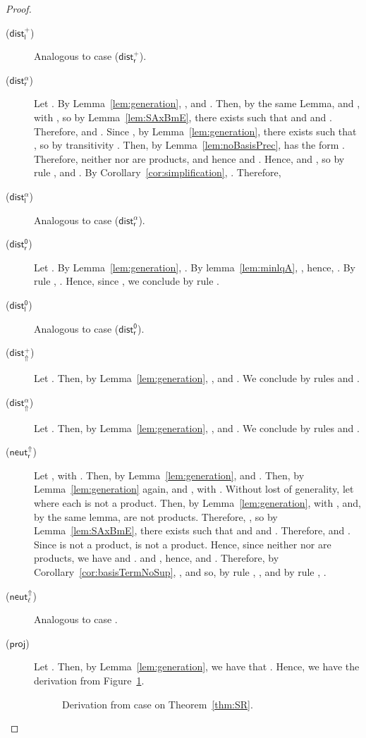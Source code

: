 \documentclass[preprint]{elsarticle}
\newcommand\s[1]{\ensuremath{\mathsf{#1}}}
\newcommand\rdistcasum{(\s{dist^+_\Uparrow})}
\newcommand\rdistcascal{(\s{dist^\alpha_\Uparrow})}
\newcommand\rcaneutl{(\s{neut^\Uparrow_\ell})}
\newcommand\rcaneutr{(\s{neut^\Uparrow_r})}
\newcommand\rproj{(\s{proj})}
\newcommand\rdistzr{(\s{dist^0_r})}
\newcommand\rdistzl{(\s{dist^0_l})}
\newcommand\rdistscalr{(\s{dist^\alpha_r})}
\newcommand\rdistscall{(\s{dist^\alpha_l})}
\newcommand\rdistsumr{(\s{dist^+_r})}
\newcommand\rdistsuml{(\s{dist^+_l})}
\begin{document}
\begin{proof}
\begin{description}
  \item[\rdistsuml] Analogous to case \rdistsumr.
  \item[\rdistscalr] Let . By Lemma~\ref{lem:generation}, , and . Then, by
    the same Lemma,  and , with , so by Lemma~\ref{lem:SAxBmE}, there exists  such that
     and  and .
    Therefore,  and .
    Since , by Lemma~\ref{lem:generation}, there exists 
    such that , so by transitivity . Then, by
    Lemma~\ref{lem:noBasisPrec},  has the form .
    Therefore, neither  nor  are products, and hence  and
    .
    Hence,  and , so by rule
    ,  and . By
    Corollary~\ref{cor:simplification}, . Therefore,
    
  \item[\rdistscall] Analogous to case \rdistscalr.
  \item[\rdistzr] Let .
    By Lemma~\ref{lem:generation}, . 
    By lemma~\ref{lem:minlqA}, ,
    hence, .
    By rule , .
    Hence, since , we conclude by rule
    .
  \item[\rdistzl] Analogous to case \rdistzr.
  \item[\rdistcasum] Let . Then, by
    Lemma~\ref{lem:generation}, ,  and . We
    conclude by rules  and .
  \item[\rdistcascal] Let . Then, by
    Lemma~\ref{lem:generation}, , and . We conclude by rules  and
    .
  \item[\rcaneutr] Let ,
    with . Then, by Lemma~\ref{lem:generation},  and . Then, by
    Lemma~\ref{lem:generation} again,  and , with
    .
    Without lost of generality, let  where each  is not
    a product. Then, by Lemma~\ref{lem:generation},  with
    , and, by the same lemma,  are not
    products.
    Therefore, , so by Lemma~\ref{lem:SAxBmE}, there exists  such that
     and  and .
    Therefore,  and .
    Since  is not a product,  is not a product. Hence, since 
    neither  nor  are products, we have  and .
     and ,
    hence,  and . Therefore, by
    Corollary~\ref{cor:basisTermNoSup}, , and so, by rule
    , , and by rule , .
  \item[\rcaneutl] Analogous to case .
  \item[\rproj] Let .
    Then, by Lemma~\ref{lem:generation}, we have that
    . Hence, we have the derivation from Figure~\ref{fig:deriv}.
    \begin{figure}[t]
      \centering
      
      \caption{Derivation from case  on Theorem~\ref{thm:SR}.}
      \label{fig:deriv}
    \end{figure}


\end{description}
\end{proof}
\end{document}
